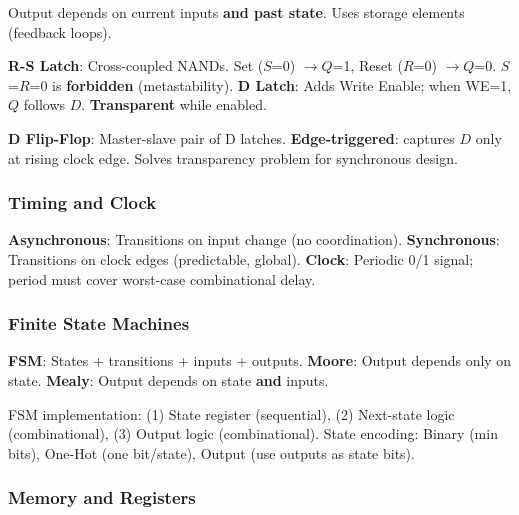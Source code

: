 \begin{definition}
	Output depends on current inputs \textbf{and past state}. Uses storage elements (feedback loops).
\end{definition}

\begin{definition}
	\textbf{R-S Latch}: Cross-coupled NANDs. Set ($S$=0) $\to Q$=1, Reset ($R$=0) $\to Q$=0. $S$=$R$=0 is \textbf{forbidden} (metastability).
	\textbf{D Latch}: Adds Write Enable; when WE=1, $Q$ follows $D$. \textbf{Transparent} while enabled.
\end{definition}

\begin{important}
	\textbf{D Flip-Flop}: Master-slave pair of D latches. \textbf{Edge-triggered}: captures $D$ only at rising clock edge. Solves transparency problem for synchronous design.
\end{important}

\subsubsection{Timing and Clock}

\begin{definition}
	\textbf{Asynchronous}: Transitions on input change (no coordination).
	\textbf{Synchronous}: Transitions on clock edges (predictable, global).
	\textbf{Clock}: Periodic 0/1 signal; period must cover worst-case combinational delay.
\end{definition}

\subsubsection{Finite State Machines}

\begin{definition}
	\textbf{FSM}: States + transitions + inputs + outputs.
	\textbf{Moore}: Output depends only on state.
	\textbf{Mealy}: Output depends on state \textbf{and} inputs.
\end{definition}

\begin{remark}
	FSM implementation: (1) State register (sequential), (2) Next-state logic (combinational), (3) Output logic (combinational). State encoding: Binary (min bits), One-Hot (one bit/state), Output (use outputs as state bits).
\end{remark}

\subsubsection{Memory and Registers}

